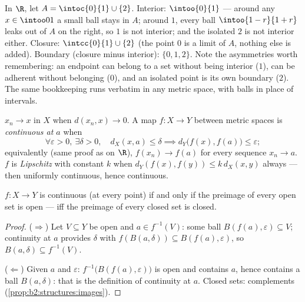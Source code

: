 \begin{example}\label{ex:b2:metric:intclosure}
In $\R$, let $A = \intoc{0}{1} \cup \{2\}$. Interior:
$\intoo{0}{1}$ --- around any $x \in \intoo01$ a small ball
stays in $A$; around $1$, every ball $\intoo{1-r}{1+r}$ leaks
out of $A$ on the right, so $1$ is not interior; and the
isolated $2$ is not interior either. Closure:
$\intcc{0}{1} \cup \{2\}$ (the point $0$ is a limit of $A$,
nothing else is added). Boundary (closure minus interior):
$\{0, 1, 2\}$. Note the asymmetries worth remembering: an
endpoint can belong to a set without being interior ($1$), can
be adherent without belonging ($0$), and an isolated point is
its own boundary ($2$). The same bookkeeping runs verbatim in
any metric space, with balls in place of intervals.
\end{example}

\begin{definition}\label{def:b2:metric:continuity}
$x_n \to x$ in $X$ when $d(x_n, x) \to 0$. A map $f \colon X \to Y$
between metric spaces is \emph{continuous at $a$} when
\[
\forall \varepsilon > 0,\ \exists\delta > 0,\quad
d_X(x, a) \leq \delta \implies d_Y\bigl(f(x), f(a)\bigr) \leq
\varepsilon ;
\]
equivalently (same proof as on $\R$), $f(x_n) \to f(a)$ for every
sequence $x_n \to a$. $f$ is \emph{Lipschitz} with constant $k$ when
$d_Y(f(x), f(y)) \leq k\, d_X(x, y)$ always --- then uniformly
continuous, hence continuous.
\end{definition}

\begin{theorem}\label{thm:b2:metric:globalcontinuity}
$f \colon X \to Y$ is continuous (at every point) if and only if the
preimage of every open set is open --- iff the preimage of every
closed set is closed.
\end{theorem}

\begin{proof}
($\Rightarrow$) Let $V \subseteq Y$ be open and $a \in f^{-1}(V)$:
some ball $B(f(a), \varepsilon) \subseteq V$; continuity at $a$
provides $\delta$ with $f(B(a, \delta)) \subseteq B(f(a),
\varepsilon)$, so $B(a, \delta) \subseteq f^{-1}(V)$.

($\Leftarrow$) Given $a$ and $\varepsilon$: $f^{-1}\bigl(B(f(a),
\varepsilon)\bigr)$ is open and contains $a$, hence contains a ball
$B(a, \delta)$: that is the definition of continuity at $a$. Closed
sets: complements (\cref{prop:b2:structures:images}).
\end{proof}

